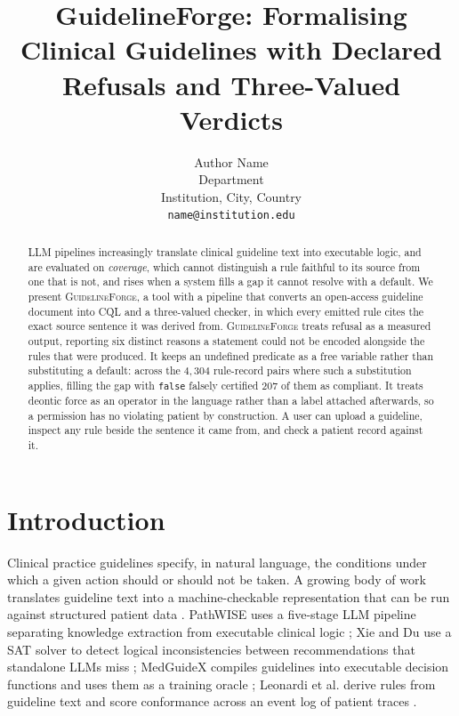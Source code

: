 \documentclass{article}
\title{GuidelineForge: Formalising Clinical Guidelines with Declared Refusals and Three-Valued Verdicts}
\author{%
  Author Name \\                    %
  Department \\                     %
  Institution, City, Country \\     %
  \texttt{name@institution.edu}     %
}
\newcommand{\budget}[1]{\marginpar{\scriptsize\color{gray}#1}}
\newcommand{\budget}[1]{}
\begin{document}
\maketitle

\begin{abstract}
LLM pipelines increasingly translate clinical guideline text into executable
logic, and are evaluated on \emph{coverage}, which cannot distinguish a rule faithful to its source
from one that is not, and rises when a system fills a gap it cannot resolve with a default. We present \textsc{GuidelineForge}, a tool with a pipeline that converts an
open-access guideline document into CQL and a three-valued checker, in which
every emitted rule cites the exact source sentence it was derived from.
\textsc{GuidelineForge} treats refusal as a measured output, reporting six
distinct reasons a statement could not be encoded alongside the rules that were
produced. It keeps an undefined predicate as a free variable rather than
substituting a default: across the $4{,}304$ rule-record pairs where such a
substitution applies, filling the gap with \texttt{false} falsely certified
$207$ of them as compliant. It treats deontic force as an operator in the
language rather than a label attached afterwards, so a permission has no
violating patient by construction. A user can upload a guideline, inspect any
rule beside the sentence it came from, and check a patient record against it.
\end{abstract}

\section{Introduction}
\label{sec:intro}
\budget{1.5 pp}

Clinical practice guidelines specify, in natural language, the conditions under which a given action should or should not be taken. A growing body of work translates guideline text into a machine-checkable representation that can be run against structured patient data \citep{guidelinesurvey}. PathWISE uses a five-stage LLM pipeline separating knowledge extraction from executable clinical logic \citep{pathwise}; Xie and Du use a SAT solver to detect logical inconsistencies between recommendations that standalone LLMs miss \citep{xiedu}; MedGuideX compiles guidelines into executable decision functions and uses them as a training oracle \citep{medguidex}; Leonardi et al. derive rules from guideline text and score conformance across an event log of patient traces \citep{leonardi}.
\end{document}

